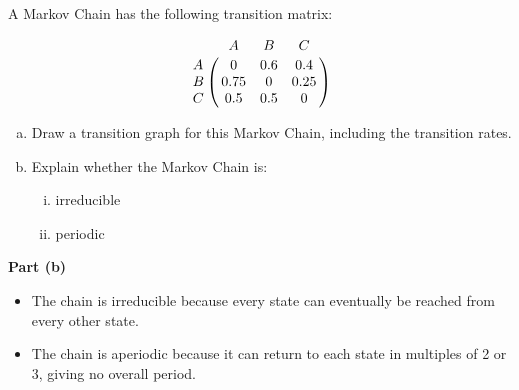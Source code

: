 \documentclass[a4paper,12pt]{article}
\begin{document}
	\large
	\noindent A Markov Chain has the following transition matrix:
	
	
	$$\bordermatrix{ & A & B &C \cr
		A & 0  & 0.6 & 0.4 \cr
		B & 0.75  &  0 &  0.25\cr
		C &  0.5  &    0.5 &0 }$$
	
	\begin{enumerate}[(a)]
		\item 
		Draw a transition graph for this Markov Chain, including the transition rates.
		
		\item 
		Explain whether the Markov Chain is:
		\begin{enumerate}[(i)]
			\item irreducible
			\item periodic
		\end{enumerate}
	\end{enumerate}
	
	
	
	\newpage
	\noindent \textbf{Part (b)}\\
	\begin{itemize}
		\item The chain is irreducible 
		because every state can eventually be reached from every other state. 
		\item The chain is aperiodic 
		because it can return to each state in multiples of 2 or 3, giving no overall
		period. 
	\end{itemize}
	
\end{document}
